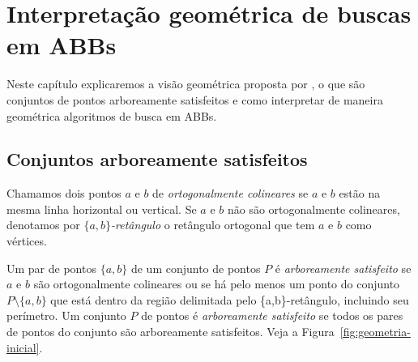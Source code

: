 
\chapter{Interpretação geométrica de buscas em ABBs}
\label{cap:geometria}

Neste capítulo explicaremos a visão geométrica proposta por \cite{geometry_of_bst}, o que são conjuntos de pontos arboreamente satisfeitos e como interpretar de maneira geométrica algoritmos de busca em ABBs.

\section{Conjuntos arboreamente satisfeitos}

Chamamos dois pontos $a$ e $b$ de \textit{ortogonalmente colineares} se $a$ e $b$ estão na mesma linha horizontal ou vertical. Se $a$ e $b$ não são ortogonalmente colineares, denotamos por \textit{$\{a,b\}$-retângulo} o retângulo ortogonal que tem $a$ e $b$ como vértices.

Um par de pontos $\{a,b\}$ de um conjunto de pontos $P$ é \textit{arboreamente satisfeito} se $a$ e $b$ são ortogonalmente colineares ou se há pelo menos um ponto do conjunto \( P \setminus \{a,b\} \) que está dentro da região delimitada pelo \{a,b\}-retângulo, incluindo seu perímetro. Um conjunto $P$ de pontos é \textit{arboreamente satisfeito} se todos os pares de pontos do conjunto são arboreamente satisfeitos. Veja a Figura~\ref{fig:geometria-inicial}.

